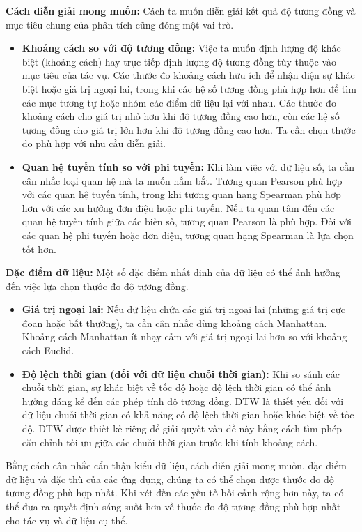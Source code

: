 \textbf{Cách diễn giải mong muốn:} Cách ta muốn diễn giải kết quả độ tương đồng và mục tiêu chung của phân tích cũng đóng một vai trò.

\begin{itemize}
  \item \textbf{Khoảng cách so với độ tương đồng:} Việc ta muốn định lượng độ khác biệt (khoảng cách) hay trực tiếp định lượng độ tương đồng tùy thuộc vào mục tiêu của tác vụ. Các thước đo khoảng cách hữu ích để nhận diện sự khác biệt hoặc giá trị ngoại lai, trong khi các hệ số tương đồng phù hợp hơn để tìm các mục tương tự hoặc nhóm các điểm dữ liệu lại với nhau. Các thước đo khoảng cách cho giá trị nhỏ hơn khi độ tương đồng cao hơn, còn các hệ số tương đồng cho giá trị lớn hơn khi độ tương đồng cao hơn. Ta cần chọn thước đo phù hợp với nhu cầu diễn giải.
  \item \textbf{Quan hệ tuyến tính so với phi tuyến:} Khi làm việc với dữ liệu số, ta cần cân nhắc loại quan hệ mà ta muốn nắm bắt. Tương quan Pearson phù hợp với các quan hệ tuyến tính, trong khi tương quan hạng Spearman phù hợp hơn với các xu hướng đơn điệu hoặc phi tuyến. Nếu ta quan tâm đến các quan hệ tuyến tính giữa các biến số, tương quan Pearson là phù hợp. Đối với các quan hệ phi tuyến hoặc đơn điệu, tương quan hạng Spearman là lựa chọn tốt hơn.
\end{itemize}

\textbf{Đặc điểm dữ liệu:} Một số đặc điểm nhất định của dữ liệu có thể ảnh hưởng đến việc lựa chọn thước đo độ tương đồng.

\begin{itemize}
  \item \textbf{Giá trị ngoại lai:} Nếu dữ liệu chứa các giá trị ngoại lai (những giá trị cực đoan hoặc bất thường), ta cần cân nhắc dùng khoảng cách Manhattan. Khoảng cách Manhattan ít nhạy cảm với giá trị ngoại lai hơn so với khoảng cách Euclid.
  \item \textbf{Độ lệch thời gian (đối với dữ liệu chuỗi thời gian):} Khi so sánh các chuỗi thời gian, sự khác biệt về tốc độ hoặc độ lệch thời gian có thể ảnh hưởng đáng kể đến các phép tính độ tương đồng. DTW là thiết yếu đối với dữ liệu chuỗi thời gian có khả năng có độ lệch thời gian hoặc khác biệt về tốc độ. DTW được thiết kế riêng để giải quyết vấn đề này bằng cách tìm phép căn chỉnh tối ưu giữa các chuỗi thời gian trước khi tính khoảng cách.
\end{itemize}

Bằng cách cân nhắc cẩn thận kiểu dữ liệu, cách diễn giải mong muốn, đặc điểm dữ liệu và đặc thù của các ứng dụng, chúng ta có thể chọn được thước đo độ tương đồng phù hợp nhất. Khi xét đến các yếu tố bối cảnh rộng hơn này, ta có thể đưa ra quyết định sáng suốt hơn về thước đo độ tương đồng phù hợp nhất cho tác vụ và dữ liệu cụ thể.

